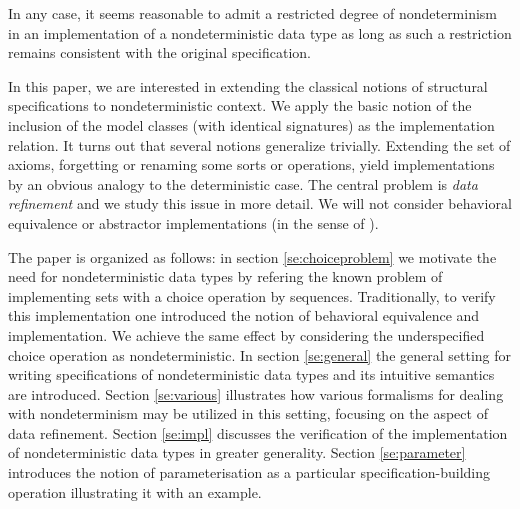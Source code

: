 In any case, it seems reasonable to admit a restricted degree of nondeterminism in an implementation of a nondeterministic data type as long as such a restriction remains consistent with the original specification. 

In this paper, we are interested in extending the classical notions of structural specifications to nondeterministic context. We apply the basic notion of the inclusion of the model classes (with identical signatures)
as the implementation relation.
It turns out that several notions
generalize trivially. Extending the set of axioms, forgetting or renaming some sorts or operations, yield implementations by an obvious analogy
to the deterministic case. The central problem is {\em data refinement} and we study this issue in more detail. We will not consider behavioral equivalence or abstractor implementations (in the sense of \cite{ST}). 

The paper is organized as follows: in section \ref{se:choiceproblem} we motivate the need for nondeterministic data types by refering the known problem of implementing sets with a choice operation by sequences. 
Traditionally, to verify this implementation one introduced the notion of behavioral equivalence and implementation. We achieve the same effect by considering the underspecified choice operation as nondeterministic. In section
\ref{se:general} the general setting for writing specifications of nondeterministic data types and its intuitive semantics are introduced. Section \ref{se:various} illustrates how various formalisms for dealing with nondeterminism may be utilized in this setting, focusing on the aspect of data refinement. Section \ref{se:impl} discusses the verification of the implementation
of nondeterministic data types in greater generality. Section \ref{se:parameter} introduces the notion of parameterisation as a particular specification-building operation illustrating it with an example. 

